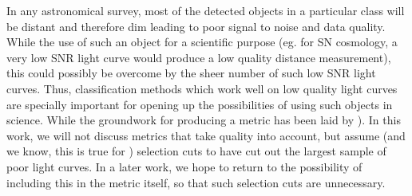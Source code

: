 In any astronomical survey, most of the detected objects in a particular class will be distant and therefore dim leading to poor signal to noise and data quality.
While the use of such an object for a scientific purpose (eg. for SN cosmology, a very low SNR light curve would produce a low quality distance measurement), this could possibly be overcome by the sheer number of such low SNR light curves.
Thus, classification methods which
work well on low quality light curves are specially important for opening up the possibilities of using such objects in science. While the groundwork for producing a metric has been laid by \cite{wu_radio_2018}).
In this work, we will not discuss metrics that take quality into account, but assume (and we know, this is true for \plasticc) selection cuts to have cut out the largest  sample of poor light curves.
In a later work, we hope to return to the possibility of including this in the metric itself, so that such selection cuts are unnecessary.
